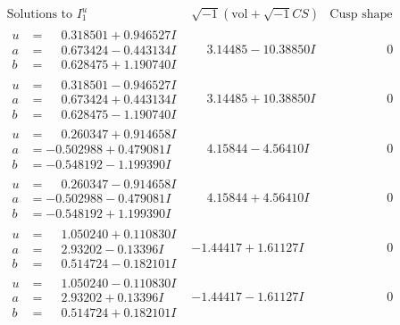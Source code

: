 \documentclass[1p]{elsarticle_modified}
\theoremstyle{definition}
\newcommand{\I}{\sqrt{-1}}
\begin{document}
$$\begin{array}{c|c|c}  
\text{Solutions to }I^u_{1}& \I (\text{vol} + \sqrt{-1}CS) & \text{Cusp shape}\\
 \hline 
\begin{aligned}
u &= \phantom{-}0.318501 + 0.946527 I \\
a &= \phantom{-}0.673424 - 0.443134 I \\
b &= \phantom{-}0.628475 + 1.190740 I\end{aligned}
 & \phantom{-}3.14485 - 10.38850 I & \phantom{-0.000000 } 0 \\ \hline\begin{aligned}
u &= \phantom{-}0.318501 - 0.946527 I \\
a &= \phantom{-}0.673424 + 0.443134 I \\
b &= \phantom{-}0.628475 - 1.190740 I\end{aligned}
 & \phantom{-}3.14485 + 10.38850 I & \phantom{-0.000000 } 0 \\ \hline\begin{aligned}
u &= \phantom{-}0.260347 + 0.914658 I \\
a &= -0.502988 + 0.479081 I \\
b &= -0.548192 - 1.199390 I\end{aligned}
 & \phantom{-}4.15844 - 4.56410 I & \phantom{-0.000000 } 0 \\ \hline\begin{aligned}
u &= \phantom{-}0.260347 - 0.914658 I \\
a &= -0.502988 - 0.479081 I \\
b &= -0.548192 + 1.199390 I\end{aligned}
 & \phantom{-}4.15844 + 4.56410 I & \phantom{-0.000000 } 0 \\ \hline\begin{aligned}
u &= \phantom{-}1.050240 + 0.110830 I \\
a &= \phantom{-}2.93202 - 0.13396 I \\
b &= \phantom{-}0.514724 - 0.182101 I\end{aligned}
 & -1.44417 + 1.61127 I & \phantom{-0.000000 } 0 \\ \hline\begin{aligned}
u &= \phantom{-}1.050240 - 0.110830 I \\
a &= \phantom{-}2.93202 + 0.13396 I \\
b &= \phantom{-}0.514724 + 0.182101 I\end{aligned}
 & -1.44417 - 1.61127 I & \phantom{-0.000000 } 0 \\ \hline\begin{aligned}

\end{aligned}
\end{array}$$
\end{document}
